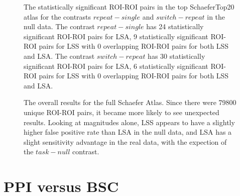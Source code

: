 \documentclass[phd,appendix,figures]{uithesis}
\begin{document}
\begin{figure}[H]
  \ContinuedFloat
  \centering


  \caption[All contrasts for all atlases for all data continued...]{
      The statistically significant ROI-ROI pairs in the top SchaeferTop20 atlas
      for the contrasts $repeat - single$ and $switch - repeat$ in the null data.
      The contrast $repeat - single$ has 24 statistically significant ROI-ROI
      pairs for LSA, 9 statistically significant ROI-ROI pairs
      for LSS with 0 overlapping ROI-ROI pairs for both LSS and LSA.
      The contrast $switch - repeat$ has 30 statistically significant ROI-ROI
      pairs for LSA, 6 statistically significant ROI-ROI pairs
      for LSS with 0 overlapping ROI-ROI pairs for both LSS and LSA.
  }
  \label{fig:significant-contrasts5}
\end{figure}

\begin{figure}[H]
  \centering


  \caption[LSS/LSA comparison using real data in the full Schaefer Atlas]{
      The overall results for the full Schaefer Atlas.
      Since there were 79800 unique ROI-ROI pairs, it became more likely
      to see unexpected results.
      Looking at magnitudes alone, LSS appears to have a slightly
      higher false positive rate than LSA in the null data, and 
      LSA has a slight sensitivity advantage in the real data, 
      with the expection of the $task - null$ contrast.
  }
  \label{fig:significant-contrasts6}
\end{figure}

\chapter{PPI versus BSC}
\end{document}
